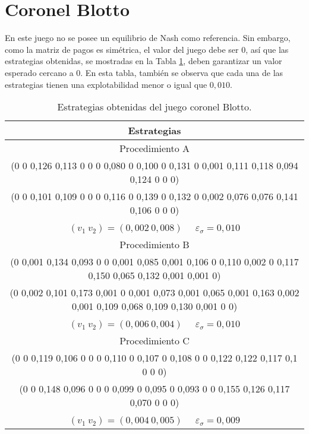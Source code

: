 \section*{Coronel Blotto}

En este juego no se posee un equilibrio de Nash como referencia. Sin embargo, como la matriz de pagos es simétrica, el valor del juego debe ser $0$, así que las estrategias obtenidas, se mostradas en la Tabla \ref{tab:estrategias-coronel-blotto}, deben garantizar un valor esperado cercano a $0$. En esta tabla, también se observa que cada una de las estrategias tienen una explotabilidad menor o igual que $0,010$.

\begin{table}[h]
    \centering
    \caption{Estrategias obtenidas del juego coronel Blotto.}
    \label{tab:estrategias-coronel-blotto}
    \scriptsize
    \begin{tabular}{c}
    \toprule
        Estrategias \\
        \midrule
        Procedimiento A \\ \midrule
         (0 0 0,126 0,113 0 0 0 0,080 0 0,100 0 0,131 0 0,001 0,111 0,118 0,094 0,124 0 0 0) \\
         (0 0 0,101 0,109 0 0 0 0,116 0 0,139 0 0,132 0 0,002 0,076 0,076 0,141 0,106 0 0 0) \\
         $(v_1\ v_2) = (0,002\ 0,008)$ \ \ $\varepsilon_{\sigma} = 0,010$ \\
        \midrule
        Procedimiento B \\ \midrule
         (0 0,001 0,134 0,093 0 0 0,001 0,085 0,001 0,106 0 0,110 0,002 0 0,117 0,150 0,065 0,132 0,001 0,001 0) \\
         (0 0,002 0,101 0,173 0,001 0 0,001 0,073 0,001 0,065 0,001 0,163 0,002 0,001 0,109 0,068 0,109 0,130 0,001 0 0) \\
         $(v_1\ v_2) = (0,006\ 0,004)$ \ \ $\varepsilon_{\sigma} = 0,010$ \\
        \midrule
        Procedimiento C \\ \midrule
         (0 0 0,119 0,106 0 0 0 0,110 0 0,107 0 0,108 0 0 0,122 0,122 0,117 0,1 0 0 0) \\
         (0 0 0,148 0,096 0 0 0 0,099 0 0,095 0 0,093 0 0 0,155 0,126 0,117 0,070 0 0 0) \\
         $(v_1\ v_2) = (0,004\ 0,005)$ \ \ $\varepsilon_{\sigma} = 0,009$ \\
        \bottomrule
    \end{tabular}
\end{table}

